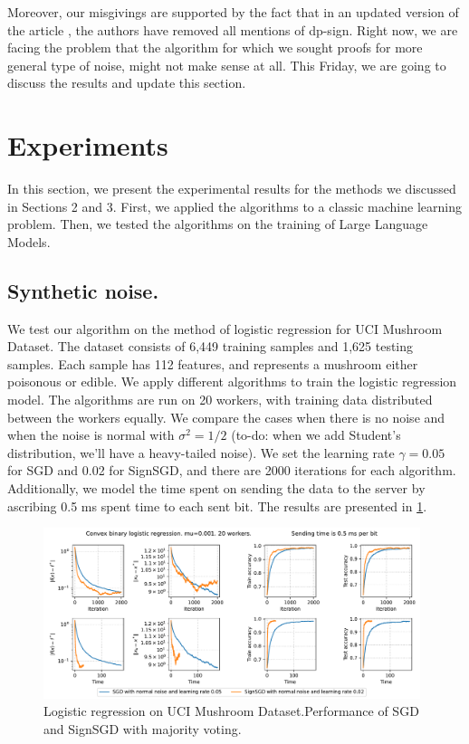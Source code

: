 \documentclass[12pt]{article}
\newcommand{\algname}[1]{{\sf  #1}\xspace}
\begin{document}
Moreover, our misgivings are supported by the fact that in an updated version \cite{Jin2024} of the article \cite{Jin2020}, the authors have removed all mentions of dp-sign. Right now, we are facing the problem that the algorithm for which we sought proofs for more general type of noise, might not make sense at all. This Friday, we are going to discuss the results and update this section.

\section{Experiments}
In this section, we present the experimental results for the methods we discussed in Sections 2 and 3. First, we applied the algorithms to a classic machine learning problem. Then, we tested the algorithms on the training of Large Language Models.

\subsection{Synthetic noise.}
We test our algorithm on the method of logistic regression for UCI Mushroom Dataset. The dataset consists of 6,449 training samples and 1,625 testing samples. Each sample has 112 features, and represents a mushroom either poisonous or edible. We apply different algorithms to train the logistic regression model. The algorithms are run on 20 workers, with training data distributed between the workers equally. We compare the cases when there is no noise and when the noise is normal with $\sigma^2 = 1/2$ (to-do: when we add Student's distribution, we'll have a heavy-tailed noise). We set the learning rate $\gamma = 0.05$ for \algname{SGD} and 0.02 for \algname{SignSGD}, and there are 2000 iterations for each algorithm. Additionally, we model the time spent on sending the data to the server by ascribing 0.5 ms spent time to each sent bit. The results are presented in \cref{fig:logreg}.
\begin{figure}[h]
    \centering
    \includegraphics[width=0.98\textwidth]{../figs/sgd_vs_sign_sgd.pdf}
    \caption{Logistic regression on UCI Mushroom Dataset.\newline Performance of SGD and SignSGD with majority voting.}
    \label{fig:logreg}
\end{figure}
\end{document}
